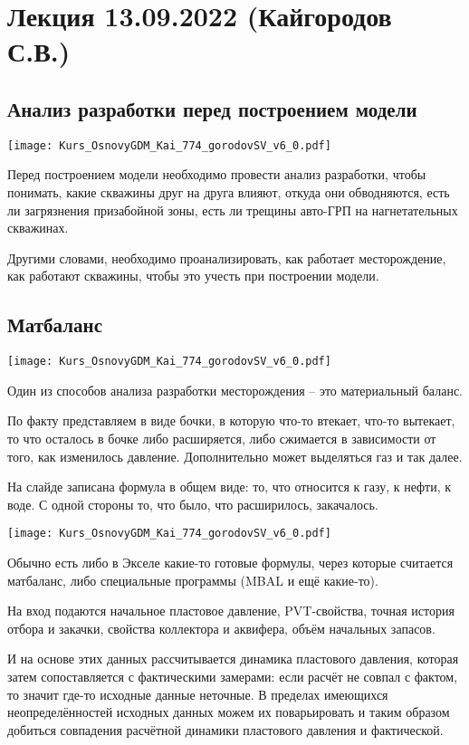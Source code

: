 \documentclass[main.tex]{subfiles}
\begin{document}
\section{Лекция 13.09.2022 (Кайгородов С.В.)}

\subsection{Анализ разработки перед построением модели}

\texttt{[image: Kurs\_OsnovyGDM\_Kai\_774\_gorodovSV\_v6\_0.pdf]}

Перед построением модели необходимо провести анализ разработки, чтобы понимать, какие скважины друг на друга влияют, откуда они обводняются, есть ли загрязнения призабойной зоны, есть ли трещины авто-ГРП на нагнетательных скважинах.

Другими словами, необходимо проанализировать, как работает месторождение, как работают скважины, чтобы это учесть при построении модели.

\subsection{Матбаланс}

\texttt{[image: Kurs\_OsnovyGDM\_Kai\_774\_gorodovSV\_v6\_0.pdf]}

Один из способов анализа разработки месторождения -- это материальный баланс.

По факту представляем в виде бочки, в которую что-то втекает, что-то вытекает, то что осталось в бочке либо расширяется, либо сжимается в зависимости от того, как изменилось давление.
Дополнительно может выделяться газ и так далее.

На слайде записана формула в общем виде: то, что относится к газу, к нефти, к воде.
С одной стороны то, что было, что расширилось, закачалось.

\texttt{[image: Kurs\_OsnovyGDM\_Kai\_774\_gorodovSV\_v6\_0.pdf]}

Обычно есть либо в Экселе какие-то готовые формулы, через которые считается матбаланс, либо специальные программы (MBAL и ещё какие-то).

На вход подаются начальное пластовое давление, PVT-свойства, точная история отбора и закачки, свойства коллектора и аквифера, объём начальных запасов.

И на основе этих данных рассчитывается динамика пластового давления, которая затем сопоставляется с фактическими замерами: если расчёт не совпал с фактом, то значит где-то исходные данные неточные.
В пределах имеющихся неопределённостей исходных данных можем их поварьировать и таким образом добиться совпадения расчётной динамики пластового давления и фактической.
\end{document}
